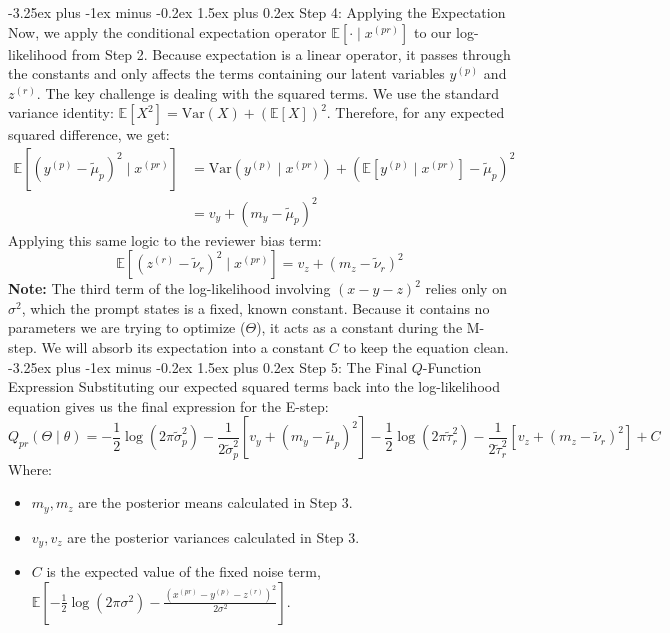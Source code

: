 \documentclass[twoside, 10pt]{article}
\makeatletter
\renewcommand{\paragraph}{\@startsection{paragraph}{4}{0pt}%
    {-3.25ex plus -1ex minus -0.2ex}%
    {1.5ex plus 0.2ex}%
    {\normalfont\normalsize\bfseries}}
\makeatother
\begin{document}
\paragraph{Step 4: Applying the Expectation}
Now, we apply the conditional expectation operator $\mathbb{E}[\cdot \mid x^{(pr)}]$ to our log-likelihood from Step 2. Because expectation is a linear operator, it passes through the constants and only affects the terms containing our latent variables $y^{(p)}$ and $z^{(r)}$.
The key challenge is dealing with the squared terms. We use the standard variance identity: $\mathbb{E}[X^2] = \text{Var}(X) + {\left(\mathbb{E}[X]\right)}^2$. Therefore, for any expected squared difference, we get:
\begin{align*}
\mathbb{E}\left[{(y^{(p)} - \tilde{\mu}_p)}^{2} \mid x^{(pr)}\right] &= \text{Var}(y^{(p)} \mid x^{(pr)}) + {\left(\mathbb{E}[y^{(p)} \mid x^{(pr)}] - \tilde{\mu}_p\right)}^{2} \\
&= v_y + {(m_y - \tilde{\mu}_p)}^{2}
\end{align*}
Applying this same logic to the reviewer bias term:
\[
\mathbb{E}\left[{(z^{(r)} - \tilde{\nu}_r)}^{2} \mid x^{(pr)}\right] = v_z + {(m_z - \tilde{\nu}_r)}^{2}
\]
\noindent\textbf{Note:} The third term of the log-likelihood involving $(x - y - z)^2$ relies only on $\sigma^2$, which the prompt states is a fixed, known constant. Because it contains no parameters we are trying to optimize ($\Theta$), it acts as a constant during the M-step. We will absorb its expectation into a constant $C$ to keep the equation clean.
\paragraph{Step 5: The Final $Q$-Function Expression}
Substituting our expected squared terms back into the log-likelihood equation gives us the final expression for the E-step:
\[
Q_{pr}(\Theta \mid \theta) = -\frac{1}{2}\log(2\pi\tilde{\sigma}_p^2) - \frac{1}{2\tilde{\sigma}_p^2} \left[ v_y + (m_y - \tilde{\mu}_p)^2 \right] - \frac{1}{2}\log(2\pi\tilde{\tau}_r^2) - \frac{1}{2\tilde{\tau}_r^2} \left[ v_z + (m_z - \tilde{\nu}_r)^2 \right] + C
\]
Where:
\begin{itemize}
    \item $m_y, m_z$ are the posterior means calculated in Step 3.
    \item $v_y, v_z$ are the posterior variances calculated in Step 3.
    \item $C$ is the expected value of the fixed noise term, $\mathbb{E}\left[-\frac{1}{2}\log(2\pi\sigma^2) - \frac{(x^{(pr)} - y^{(p)} - z^{(r)})^2}{2\sigma^2}\right]$.
\end{itemize}
\end{document}
